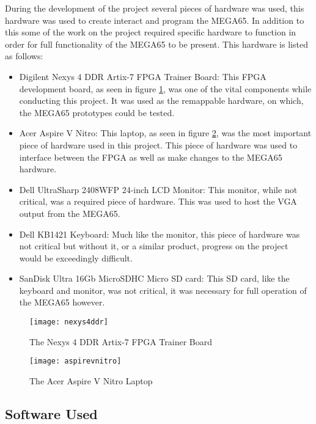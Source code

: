 \label{Ch3 Sec2 Sub1}

During the development of the project several pieces of hardware was used, this hardware was used to create interact and program the MEGA65. In addition to this some of the work on the project required specific hardware to function in order for full functionality of the MEGA65 to be present. This hardware is listed as follows:\\

\begin{itemize}
\item{Digilent Nexys 4 DDR Artix-7 FPGA Trainer Board: This FPGA development board, as seen in figure \ref{fig:nexys4ddr}, was one of the vital components while conducting this project. It was used as the remappable hardware, on which, the MEGA65 prototypes could be tested.}
\item{Acer Aspire V Nitro: This laptop, as seen in figure \ref{fig:aspirevnitro}, was the most important piece of hardware used in this project. This piece of hardware was used to interface between the FPGA as well as make changes to the MEGA65 hardware.}
\item{Dell UltraSharp 2408WFP 24-inch LCD Monitor: This monitor, while not critical, was a required piece of hardware. This was used to host the VGA output from the MEGA65.}
\item{Dell KB1421 Keyboard: Much like the monitor, this piece of hardware was not critical but without it, or a similar product, progress on the project would be exceedingly difficult.}
\item{SanDisk Ultra 16Gb MicroSDHC Micro SD card: This SD card, like the keyboard and monitor, was not critical, it was necessary for full operation of the MEGA65 however.}
\end{itemize}

\begin{figure}
  \centering
  \texttt{[image: nexys4ddr]}
  \caption{The Nexys 4 DDR Artix-7 FPGA Trainer Board}
  \label{fig:nexys4ddr}
\end{figure}

\begin{figure}
  \centering
  \texttt{[image: aspirevnitro]}
  \caption{The Acer Aspire V Nitro Laptop}
  \label{fig:aspirevnitro}
\end{figure}

\subsection{Software Used}

